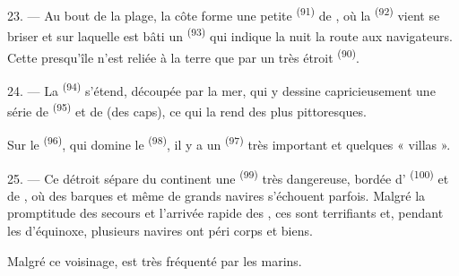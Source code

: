 23. --- Au bout de la plage, la côte forme une petite 
\textsuperscript{(91)} de , où la 
\textsuperscript{(92)} vient se briser et sur laquelle est bâti un
 \textsuperscript{(93)} qui indique la nuit la route aux
navigateurs. Cette presqu'île n'est reliée à la terre que par un 
très étroit \textsuperscript{(90)}.

\VUsaut{3.0mm}
\VUsaut{3.0mm}

24. --- La  \textsuperscript{(94)} s'étend, découpée par la mer,
qui y dessine capricieusement une série de  \textsuperscript{(95)}
et de  (des caps), ce qui la rend des plus pittoresques.

Sur le  \textsuperscript{(96)}, qui domine le 
\textsuperscript{(98)}, il y a un  \textsuperscript{(97)} très
important et quelques « villas ».

25. --- Ce détroit sépare du continent une  \textsuperscript{(99)}
très dangereuse, bordée d' \textsuperscript{(100)} et de
, où des barques et même de grands navires s'échouent parfois.
Malgré la promptitude des secours et l'arrivée rapide des , ces  sont terrifiants et, pendant les
 d'équinoxe, plusieurs navires ont péri corps et biens.

Malgré ce voisinage,  est très fréquenté par les marins.
\VUsaut{6.0mm}
\VUfilet{22mm}
